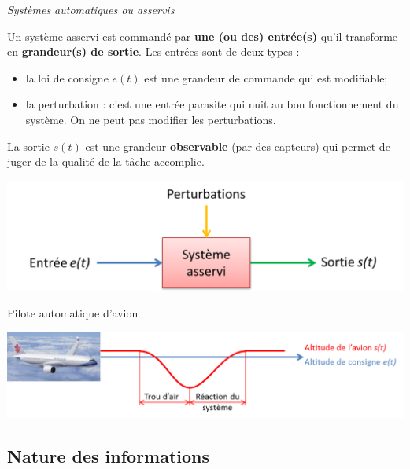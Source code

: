 \documentclass[11pt,oneside]{article}
\begin{document}
\begin{defi}
 \textit{\textsf{Systèmes automatiques ou asservis}}

Un système asservi est commandé par \textbf{une (ou des) entrée(s)} qu'il
transforme en \textbf{grandeur(s) de sortie}.
Les entrées sont de deux types : 
\begin{itemize}
 \item la loi de consigne $e(t)$ est une grandeur de commande qui est
modifiable;
\item la perturbation : c'est une entrée parasite qui nuit au bon
fonctionnement du système. On ne peut pas modifier les perturbations.
\end{itemize}

La sortie $s(t)$ est une grandeur \textbf{observable} (par des capteurs) qui
permet de juger de la qualité de la tâche accomplie.
\end{defi} 

 \begin{center}
    \includegraphics[width=.6\textwidth]{png/asservi}
  \end{center}
	

\begin{exemple}
Pilote automatique d'avion

 \begin{center}
    \includegraphics[width=.8\textwidth]{png/piloteauto}
  \end{center}
\end{exemple}



\subsection{Nature des informations}
\end{document}
